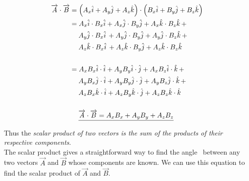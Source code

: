 \begin{mathbox}
\begin{align*}
\overrightarrow{A} \cdot \overrightarrow{B} &= \left(A_x\hat{i} + A_y\hat{j} + A_z\hat{k}\right) \cdot \left(B_x\hat{i} + B_y\hat{j} + B_z\hat{k}\right) \\
&= A_x\hat{i} \cdot B_x\hat{i} + A_x\hat{j} \cdot B_y\hat{j} + A_x\hat{k} \cdot B_z\hat{k}\, +\\
&\hspace{4.5mm} A_y\hat{j} \cdot B_x\hat{i}\, + A_y\hat{j} \cdot B_y\hat{j} + A_y\hat{j} \cdot B_z\hat{k}\, +\\
&\hspace{4.5mm} A_z\hat{k} \cdot B_x\hat{i}\, + A_z\hat{k} \cdot B_y\hat{j} + A_z\hat{k} \cdot B_z\hat{k}\,\\\\
&= A_x B_x\hat{i}\cdot\hat{i} + A_y B_y\hat{i}\cdot\hat{j} + A_x B_z\hat{i}\cdot\hat{k}\, + \\ 
&\hspace{4.5mm} A_y B_x\hat{j} \cdot \hat{i} + A_y B_y\hat{j} \cdot \hat{j} + A_y B_z\hat{j} \cdot \hat{k}\, +\\
&\hspace{4.5mm} A_z B_x\hat{k} \cdot \hat{i} + A_z B_y\hat{k} \cdot \hat{j} + A_z B_z\hat{k} \cdot \hat{k} \\\\
&\hspace{4.5mm} \underline{\overrightarrow{A} \cdot \overrightarrow{B} = A_x B_x + A_y B_y + A_z B_z}
\end{align*}
\end{mathbox}
 
Thus the \textit{scalar product of two vectors is the sum of the products of their respective components}.\\

The scalar product gives a straightforward way to find the angle \phi\, between any two vectors $\overrightarrow{A}$ and $\overrightarrow{B}$ whose components are known. We can use this equation to find the scalar product of $\overrightarrow{A}$ and $\overrightarrow{B}$.

